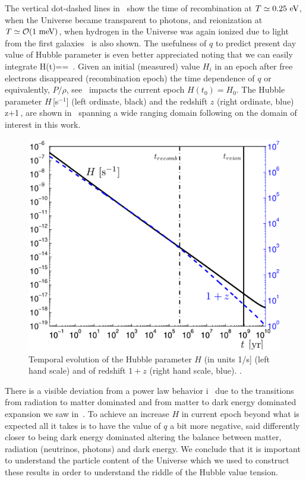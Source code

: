 The vertical dot-dashed lines in~ show the time of recombination at $T\simeq0.25\text{ eV}$, when the Universe became transparent to photons, and reionization at $T\simeq {\cal O}(1\meV)$, when hydrogen in the Universe was again ionized due to light from the first galaxies~\cite{Zaroubi:2012in} is also shown. The usefulness of $q$ to predict present day value of Hubble parameter is even better appreciated noting that we can easily integrate  
\beqn\label{eq:HdotInt}
H(t)==
\,.
\eeqn
Given an initial (measured) value $H_i$ in an epoch after free electrons disappeared (recombination epoch) the time dependence of $q$ or equivalently, $P/\rho$, see~ impacts the current epoch $H(t_0)=H_0$. The Hubble parameter 
$H$\,[s$^{-1}$] (left ordinate, black) and the redshift $z$ (right ordinate, blue) 
\beqn\label{eq:zdef}
z+1\equiv {}\,,
\eeqn
are shown in~ spanning a wide ranging domain following on the domain of interest in this work. 

\begin{figure}
\centerline{\includegraphics[width=0.90\linewidth]{01-introduction/Figures/Hztoday.png}}
\caption{Temporal evolution of the Hubble parameter $H$ (in units 1/s] (left hand scale) and of redshift $1+z$ (right hand scale, blue). . 
\label{fig:today1} }
\end{figure}


There is a visible deviation from a power law behavior i~ due to the transitions from radiation to matter dominated and from matter to dark energy dominated expansion we saw in~. To achieve an increase $H$ in current epoch beyond what is expected all it takes is to have the value of $q$ a bit more negative, said differently closer to being dark energy dominated altering the balance between matter, radiation (neutrinos, photons) and dark energy. We conclude that it is important to understand the particle content of the Universe which we used to construct these results in order to understand the riddle of the Hubble value tension.

